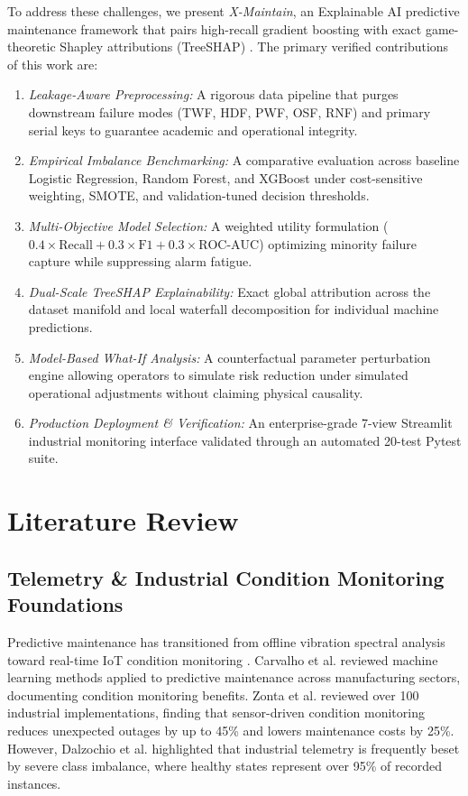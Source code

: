 \documentclass[journal,10pt,twocolumn]{IEEEtran}
\begin{document}
To address these challenges, we present \emph{X-Maintain}, an Explainable AI predictive maintenance framework that pairs high-recall gradient boosting with exact game-theoretic Shapley attributions (TreeSHAP) \cite{lundberg2017, obeten2026}. The primary verified contributions of this work are:
\begin{enumerate}
    \item \emph{Leakage-Aware Preprocessing:} A rigorous data pipeline that purges downstream failure modes (TWF, HDF, PWF, OSF, RNF) and primary serial keys to guarantee academic and operational integrity.
    \item \emph{Empirical Imbalance Benchmarking:} A comparative evaluation across baseline Logistic Regression, Random Forest, and XGBoost under cost-sensitive weighting, SMOTE, and validation-tuned decision thresholds.
    \item \emph{Multi-Objective Model Selection:} A weighted utility formulation ($0.4\times\text{Recall} + 0.3\times\text{F1} + 0.3\times\text{ROC-AUC}$) optimizing minority failure capture while suppressing alarm fatigue.
    \item \emph{Dual-Scale TreeSHAP Explainability:} Exact global attribution across the dataset manifold and local waterfall decomposition for individual machine predictions.
    \item \emph{Model-Based What-If Analysis:} A counterfactual parameter perturbation engine allowing operators to simulate risk reduction under simulated operational adjustments without claiming physical causality.
    \item \emph{Production Deployment \& Verification:} An enterprise-grade 7-view Streamlit industrial monitoring interface validated through an automated 20-test Pytest suite.
\end{enumerate}

\section{Literature Review}
\subsection{Telemetry \& Industrial Condition Monitoring Foundations}
Predictive maintenance has transitioned from offline vibration spectral analysis toward real-time IoT condition monitoring \cite{zonta2020, carvalho2019}. Carvalho et al. \cite{carvalho2019} reviewed machine learning methods applied to predictive maintenance across manufacturing sectors, documenting condition monitoring benefits. Zonta et al. \cite{zonta2020} reviewed over 100 industrial implementations, finding that sensor-driven condition monitoring reduces unexpected outages by up to 45\% and lowers maintenance costs by 25\%. However, Dalzochio et al. \cite{dalzochio2020} highlighted that industrial telemetry is frequently beset by severe class imbalance, where healthy states represent over 95\% of recorded instances.
\end{document}
